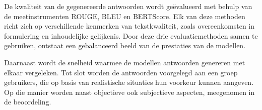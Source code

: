 De kwaliteit van de gegenereerde antwoorden wordt geëvalueerd met behulp van de meetinstrumenten ROUGE, BLEU en BERTScore. Elk van deze methoden richt zich op verschillende kenmerken van tekstkwaliteit, zoals overeenkomsten in formulering en inhoudelijke gelijkenis. Door deze drie evaluatiemethoden samen te gebruiken, ontstaat een gebalanceerd beeld van de prestaties van de modellen.

Daarnaast wordt de snelheid waarmee de modellen antwoorden genereren met elkaar vergeleken. Tot slot worden de antwoorden voorgelegd aan een groep gebruikers, die op basis van realistische situaties hun voorkeur kunnen aangeven. Op die manier worden naast objectieve ook subjectieve aspecten, meegenomen in de beoordeling.


